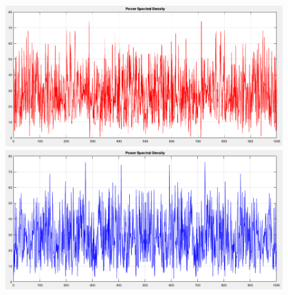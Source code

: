 \documentclass[12pt]{article}
\begin{document}
    \begin{figure}[H]
      \centering
      \begin{minipage}{0.5\textwidth}
        \centering
        \includegraphics[width=0.95\textwidth]{seq1_1000_psd.png}
      \end{minipage}%
      \begin{minipage}{0.5\textwidth}
        \centering
        \includegraphics[width=0.95\textwidth]{seq2_1000_psd.png}
      \end{minipage}
    \end{figure}
\end{document}
